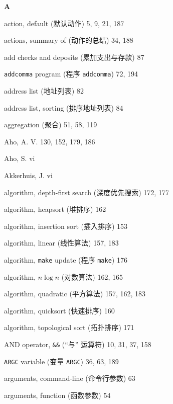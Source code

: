 \begin{multicols}{2}
\medskip\textbf{\large{A}}

\hangindent=2pc  action, default (默认动作) 5, 9, 21, 187

\hangindent=2pc  actions, summary of (动作的总结) 34, 188

\hangindent=2pc  add checks and deposits (累加支出与存款) 87

\hangindent=2pc  \verb'addcomma' program (程序 \verb'addcomma') 72, 194

\hangindent=2pc  address list (地址列表) 82

\hangindent=2pc  address list, sorting (排序地址列表) 84

\hangindent=2pc  aggregation (聚合) 51, 58, 119

\hangindent=2pc  Aho, A. V. 130, 152, 179, 186

\hangindent=2pc  Aho, S. vi

\hangindent=2pc  Akkerhuis, J. vi

\hangindent=2pc  algorithm, depth-first search (深度优先搜索) 172, 177

\hangindent=2pc  algorithm, heapsort (堆排序) 162

\hangindent=2pc  algorithm, insertion sort (插入排序) 153

\hangindent=2pc  algorithm, linear (线性算法) 157, 183

\hangindent=2pc  algorithm, \verb'make' update (程序
\verb'make') 176

\hangindent=2pc  algorithm, $n\log n$ (对数算法) 162, 165

\hangindent=2pc  algorithm, quadratic (平方算法) 157, 162, 183

\hangindent=2pc  algorithm, quicksort (快速排序) 160

\hangindent=2pc  algorithm, topological sort (拓扑排序) 171

\hangindent=2pc  AND operator, \verb'&&' (``与'' 运算符) 10, 31, 37, 158

\hangindent=2pc  \verb'ARGC' variable (变量 \verb'ARGC') 36, 63, 189

\hangindent=2pc  arguments, command-line (命令行参数) 63

\hangindent=2pc  arguments, function (函数参数) 54


\end{multicols}

